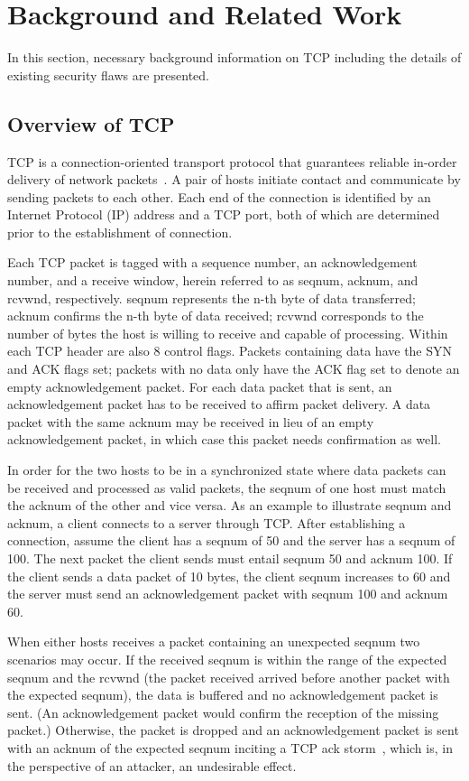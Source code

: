 \documentclass{sig-alternate}
\begin{document}
\section{Background and Related Work}
\label{sec:background}

In this section, necessary background information on TCP including the details of existing security flaws are presented.

\subsection{Overview of TCP}

TCP is a connection-oriented transport protocol that guarantees reliable in-order delivery of network packets~\cite{rfc:tcp}.
A pair of hosts initiate contact and communicate by sending packets to each other.
Each end of the connection is identified by an Internet Protocol (IP) address and a TCP port, both of which are determined prior to the establishment of connection.

Each TCP packet is tagged with a sequence number, an acknowledgement number, and a receive window, herein referred to as seqnum, acknum, and rcvwnd, respectively.
seqnum represents the n-th byte of data transferred; acknum confirms the n-th byte of data received; rcvwnd corresponds to the number of bytes the host is willing to receive and capable of processing.
Within each TCP header are also 8 control flags.
Packets containing data have the SYN and ACK flags set; packets with no data only have the ACK flag set to denote an empty acknowledgement packet.
For each data packet that is sent, an acknowledgement packet has to be received to affirm packet delivery.
A data packet with the same acknum may be received in lieu of an empty acknowledgement packet, in which case this packet needs confirmation as well.

In order for the two hosts to be in a synchronized state where data packets can be received and processed as valid packets, the seqnum of one host must match the acknum of the other and vice versa. 
As an example to illustrate seqnum and acknum, a client connects to a server through TCP.
After establishing a connection, assume the client has a seqnum of 50 and the server has a seqnum of 100.
The next packet the client sends must entail seqnum 50 and acknum 100.
If the client sends a data packet of 10 bytes, the client seqnum increases to 60 and the server must send an acknowledgement packet with seqnum 100 and acknum 60.

When either hosts receives a packet containing an unexpected seqnum two scenarios may occur.
If the received seqnum is within the range of the expected seqnum and the rcvwnd (the packet received arrived before another packet with the expected seqnum), the data is buffered and no acknowledgement packet is sent.
(An acknowledgement packet would confirm the reception of the missing packet.)
Otherwise, the packet is dropped and an acknowledgement packet is sent with an acknum of the expected seqnum inciting a TCP ack storm~\cite{anderson:ackstorm}, which is, in the perspective of an attacker, an undesirable effect.
\end{document}
